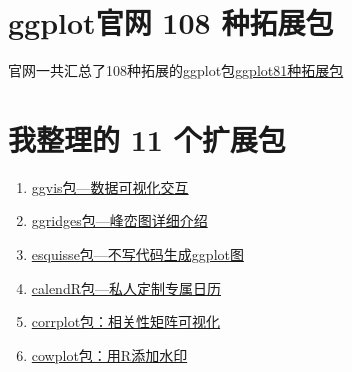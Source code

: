 \documentclass[
]{book}
\begin{document}
\hypertarget{ggplotux5b98ux7f51-108-ux79cdux62d3ux5c55ux5305}{%
\section{ggplot官网 108 种拓展包}\label{ggplotux5b98ux7f51-108-ux79cdux62d3ux5c55ux5305}}

官网一共汇总了108种拓展的ggplot包\href{https://exts.ggplot2.tidyverse.org/gallery/}{ggplot81种拓展包}

\hypertarget{ux6211ux6574ux7406ux7684-11-ux4e2aux6269ux5c55ux5305}{%
\section{我整理的 11 个扩展包}\label{ux6211ux6574ux7406ux7684-11-ux4e2aux6269ux5c55ux5305}}

\begin{enumerate}
\def\labelenumi{\arabic{enumi}.}
\item
  \href{http://mp.weixin.qq.com/s?__biz=MzI1NjUwMjQxMQ==\&mid=2247488405\&idx=1\&sn=271fc88b523e738a6a1d92504dbce330\&chksm=ea24ec71dd5365671bb66cbb50afdb0b00762b7581b9d3e5060a4b59021485364093f1c8b963\&scene=21\#wechat_redirect}{ggvis包---数据可视化交互}
\item
  \href{http://mp.weixin.qq.com/s?__biz=MzI1NjUwMjQxMQ==\&mid=2247488248\&idx=1\&sn=6b71d7adba5ea796fdfe8f49fe232d94\&chksm=ea24ed1cdd53640a1e30271584458097fce82a732f9d63ce2084dc63fbae6fb028fd7f813bb7\&scene=21\#wechat_redirect}{ggridges包---峰峦图详细介绍}
\item
  \href{http://mp.weixin.qq.com/s?__biz=MzI1NjUwMjQxMQ==\&mid=2247488200\&idx=1\&sn=3a058480b104165118975b2d908dff72\&chksm=ea24ed2cdd53643a9deb58069cd8d0e9933fc165994a2bb7a6f7d4651c7796b839fc781ec86d\&scene=21\#wechat_redirect}{esquisse包---不写代码生成ggplot图}
\item
  \href{http://mp.weixin.qq.com/s?__biz=MzI1NjUwMjQxMQ==\&mid=2247487814\&idx=1\&sn=aa58149b66ce8b6d1c6210ded418c71a\&chksm=ea24eea2dd5367b4a24a670b9e78d377f1506399be8dd0d0a35230407e3dc131f6b07ab3d9ca\&scene=21\#wechat_redirect}{calendR包---私人定制专属日历}
\item
  \href{http://mp.weixin.qq.com/s?__biz=MzI1NjUwMjQxMQ==\&mid=2247487625\&idx=1\&sn=3102c4afb0cf97904d810579af386eb6\&chksm=ea24ef6ddd53667b887d11e7013589f796c8ff4f9e1e9b6e8df817ea7b223baadbc19dfbaaa5\&scene=21\#wechat_redirect}{corrplot包：相关性矩阵可视化}
\item
  \href{http://mp.weixin.qq.com/s?__biz=MzI1NjUwMjQxMQ==\&mid=2247486838\&idx=2\&sn=21ee1c8b683e7d27373f3e1f40901428\&chksm=ea24f292dd537b843db330a88161ce6f89227418f64515164615c3f63721df6464b6d91a2b1a\&scene=21\#wechat_redirect}{cowplot包：用R添加水印}

\end{enumerate}
\end{document}
